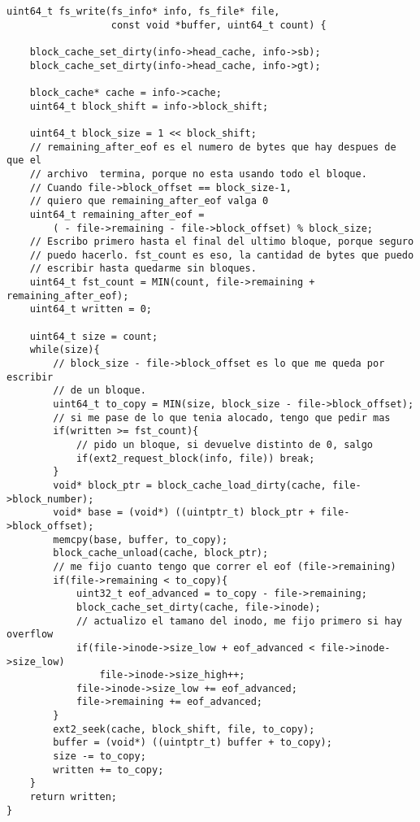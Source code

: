 \begin{lstlisting}[style=customcmucho]
uint64_t fs_write(fs_info* info, fs_file* file,
                  const void *buffer, uint64_t count) {

    block_cache_set_dirty(info->head_cache, info->sb);
    block_cache_set_dirty(info->head_cache, info->gt);

    block_cache* cache = info->cache;
    uint64_t block_shift = info->block_shift;

    uint64_t block_size = 1 << block_shift;
    // remaining_after_eof es el numero de bytes que hay despues de que el
    // archivo  termina, porque no esta usando todo el bloque.
    // Cuando file->block_offset == block_size-1,
    // quiero que remaining_after_eof valga 0
    uint64_t remaining_after_eof =
        ( - file->remaining - file->block_offset) % block_size;
    // Escribo primero hasta el final del ultimo bloque, porque seguro
    // puedo hacerlo. fst_count es eso, la cantidad de bytes que puedo
    // escribir hasta quedarme sin bloques.
    uint64_t fst_count = MIN(count, file->remaining + remaining_after_eof);
    uint64_t written = 0;
    
    uint64_t size = count;
    while(size){
        // block_size - file->block_offset es lo que me queda por escribir
        // de un bloque.
        uint64_t to_copy = MIN(size, block_size - file->block_offset);
        // si me pase de lo que tenia alocado, tengo que pedir mas
        if(written >= fst_count){
            // pido un bloque, si devuelve distinto de 0, salgo
            if(ext2_request_block(info, file)) break;
        }
        void* block_ptr = block_cache_load_dirty(cache, file->block_number);
        void* base = (void*) ((uintptr_t) block_ptr + file->block_offset);
        memcpy(base, buffer, to_copy);
        block_cache_unload(cache, block_ptr);
        // me fijo cuanto tengo que correr el eof (file->remaining)
        if(file->remaining < to_copy){
            uint32_t eof_advanced = to_copy - file->remaining;
            block_cache_set_dirty(cache, file->inode);
            // actualizo el tamano del inodo, me fijo primero si hay overflow
            if(file->inode->size_low + eof_advanced < file->inode->size_low)
                file->inode->size_high++;
            file->inode->size_low += eof_advanced;
            file->remaining += eof_advanced;
        }
        ext2_seek(cache, block_shift, file, to_copy);
        buffer = (void*) ((uintptr_t) buffer + to_copy);
        size -= to_copy;
        written += to_copy;
    }
    return written;
}
\end{lstlisting}

